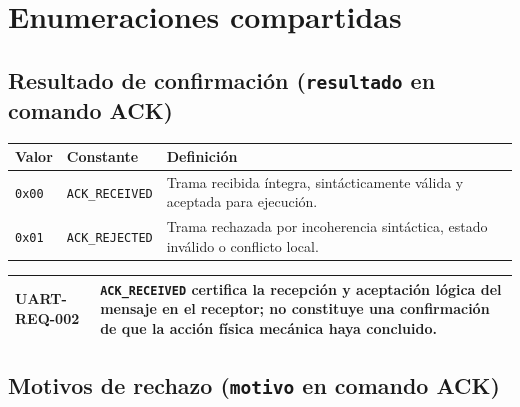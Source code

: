 \documentclass[a4paper,11pt]{article}
\newcommand{\tablehead}[1]{\cellcolor{SAIDBlue}\color{white}\textbf{#1}}
\newcommand{\requirement}[2]{%
    \par\smallskip
    \noindent\begin{tabularx}{\textwidth}{|>{\bfseries}p{3.2cm}|X|}
        \hline
        \cellcolor{SAIDLight}#1 & #2 \\
        \hline
    \end{tabularx}
    \par\smallskip
}
\begin{document}
\section{Enumeraciones compartidas}

\subsection{Resultado de confirmación (\texttt{resultado} en comando ACK)}

\noindent\begin{tabularx}{\textwidth}{|p{1.8cm}|p{3.5cm}|X|}
    \hline
    \tablehead{Valor} & \tablehead{Constante} & \tablehead{Definición} \\
    \hline
    \texttt{0x00} & \texttt{ACK\_RECEIVED} & Trama recibida íntegra, sintácticamente válida y aceptada para ejecución. \\
    \hline
    \texttt{0x01} & \texttt{ACK\_REJECTED} & Trama rechazada por incoherencia sintáctica, estado inválido o conflicto local. \\
    \hline
\end{tabularx}

\requirement{UART-REQ-002}{\texttt{ACK\_RECEIVED} certifica la recepción y aceptación lógica del mensaje en el receptor; no constituye una confirmación de que la acción física mecánica haya concluido.}

\subsection{Motivos de rechazo (\texttt{motivo} en comando ACK)}
\end{document}
